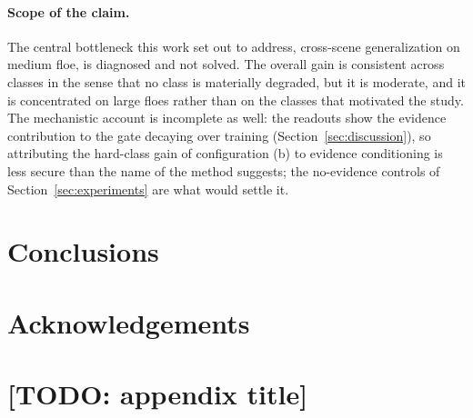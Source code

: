 \documentclass[preprint,12pt,authoryear]{elsarticle}
\begin{document}
\paragraph{Scope of the claim.} The central bottleneck this work set out to
address, cross-scene generalization on medium floe, is diagnosed and not
solved. The overall gain is consistent across classes in the sense that no class
is materially degraded, but it is moderate, and it is concentrated on large
floes rather than on the classes that motivated the study. The mechanistic
account is incomplete as well: the readouts show the evidence contribution to
the gate decaying over training (Section~\ref{sec:discussion}), so attributing
the hard-class gain of configuration (b) to evidence conditioning is less secure
than the name of the method suggests; the no-evidence controls of
Section~\ref{sec:experiments} are what would settle it.

\section{Conclusions}
\label{sec:conclusions}


\section*{Acknowledgements}


\appendix

\section{[TODO: appendix title]}



\end{document}
